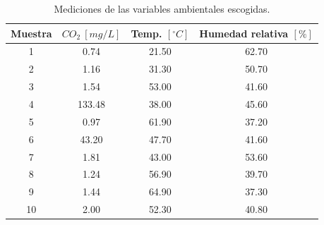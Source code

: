 \begin{table}[htbp]
\caption{Mediciones de las variables ambientales escogidas.}
\label{tab:analisis_sensores}
\centering
\begin{tabular}{cccc}
\toprule
\textbf{Muestra} & \textbf{$CO_2~[mg/L]$} & \textbf{Temp. $[^\circ C]$} & \textbf{Humedad relativa $[\%]$} \\ 
\midrule
1  & 0.74  & 21.50 & 62.70 \\
2  & 1.16  & 31.30 & 50.70 \\
3  & 1.54  & 53.00 & 41.60 \\
4  & 133.48  & 38.00 & 45.60 \\
5  & 0.97  & 61.90 & 37.20 \\
6  & 43.20 & 47.70 & 41.60 \\
7  & 1.81  & 43.00 & 53.60 \\
8  & 1.24  & 56.90 & 39.70 \\
9  & 1.44  & 64.90 & 37.30 \\
10 & 2.00  & 52.30 & 40.80 \\
\bottomrule
\end{tabular}
\end{table}